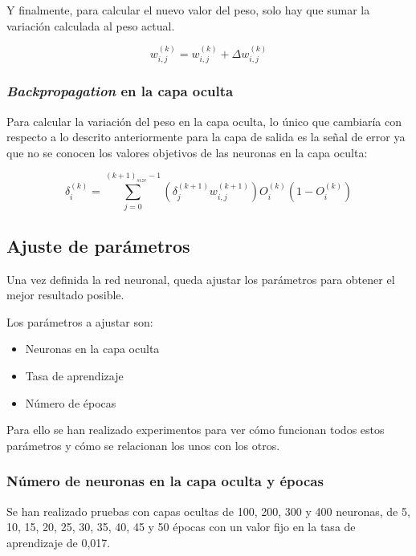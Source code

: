 Y finalmente, para calcular el nuevo valor del peso, solo hay que sumar la variación calculada al peso actual.

\[ w^{(k)}_{i,j} = w^{(k)}_{i,j} +\Delta w^{(k)}_{i,j} \]

\subsubsection{\textit{Backpropagation} en la capa oculta}

Para calcular la variación del peso en la capa oculta, lo único que cambiaría con respecto a lo descrito anteriormente para la capa de salida es la señal de error ya que no se conocen los valores objetivos de las neuronas en la capa oculta:

\[ \delta^{(k)}_{i} = \sum_{j=0}^{(k+1)_{size}-1}(\delta^{(k+1)}_{j} w^{(k+1)}_{i,j}) O^{(k)}_{i} (1 - O^{(k)}_{i}) \]

\subsection{Ajuste de parámetros}

Una vez definida la red neuronal, queda ajustar los parámetros para obtener el mejor resultado posible.

Los parámetros a ajustar son:
\begin{itemize}
	\item Neuronas en la capa oculta
	\item Tasa de aprendizaje
	\item Número de épocas
\end{itemize}

Para ello se han realizado experimentos para ver cómo funcionan todos estos parámetros y cómo se relacionan los unos con los otros.

\subsubsection{Número de neuronas en la capa oculta y épocas}

Se han realizado pruebas con capas ocultas de 100, 200, 300 y 400 neuronas, de 5, 10, 15, 20, 25, 30, 35, 40, 45 y 50 épocas con un valor fijo en la tasa de aprendizaje de 0,017.

